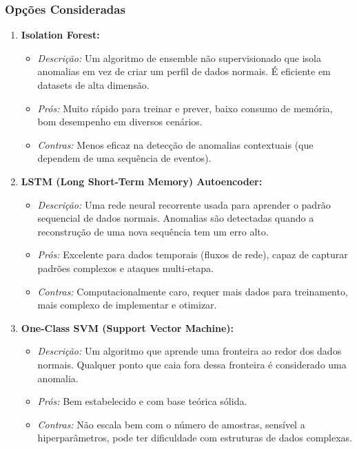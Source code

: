 \documentclass[a4paper,12pt]{article}
\begin{document}
\subsubsection{Opções Consideradas}
\begin{enumerate}
    \item \textbf{Isolation Forest:}
    \begin{itemize}
        \item \textit{Descrição:} Um algoritmo de ensemble não supervisionado que isola anomalias em vez de criar um perfil de dados normais. É eficiente em datasets de alta dimensão.
        \item \textit{Prós:} Muito rápido para treinar e prever, baixo consumo de memória, bom desempenho em diversos cenários.
        \item \textit{Contras:} Menos eficaz na detecção de anomalias contextuais (que dependem de uma sequência de eventos).
    \end{itemize}

    \item \textbf{LSTM (Long Short-Term Memory) Autoencoder:}
    \begin{itemize}
        \item \textit{Descrição:} Uma rede neural recorrente usada para aprender o padrão sequencial de dados normais. Anomalias são detectadas quando a reconstrução de uma nova sequência tem um erro alto.
        \item \textit{Prós:} Excelente para dados temporais (fluxos de rede), capaz de capturar padrões complexos e ataques multi-etapa.
        \item \textit{Contras:} Computacionalmente caro, requer mais dados para treinamento, mais complexo de implementar e otimizar.
    \end{itemize}

    \item \textbf{One-Class SVM (Support Vector Machine):}
    \begin{itemize}
        \item \textit{Descrição:} Um algoritmo que aprende uma fronteira ao redor dos dados normais. Qualquer ponto que caia fora dessa fronteira é considerado uma anomalia.
        \item \textit{Prós:} Bem estabelecido e com base teórica sólida.
        \item \textit{Contras:} Não escala bem com o número de amostras, sensível a hiperparâmetros, pode ter dificuldade com estruturas de dados complexas.
    \end{itemize}
\end{enumerate}
\end{document}
